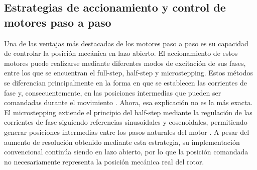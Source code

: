 \subsection{Estrategias de accionamiento y control de motores paso a paso}


%
%
%
%

Una de las ventajas más destacadas de los motores paso a paso es su capacidad de controlar la posición mecánica en lazo abierto. El accionamiento de estos motores puede realizarse mediante diferentes modos de excitación de sus fases, entre los que se encuentran el full-step, half-step y microstepping. Estos métodos se diferencian principalmente en la forma en que se establecen las corrientes de fase y, consecuentemente, en las posiciones intermedias que pueden ser comandadas durante el movimiento \cite{lydellSensorlessHybridFieldOriented}.
%
%
%
%
Ahora, esa explicación no es la más exacta. El microstepping extiende el principio del half-step mediante la regulación de las corrientes de fase siguiendo referencias sinusoidales y cosenoidales, permitiendo generar posiciones intermedias entre los pasos naturales del motor \cite{lydellSensorlessHybridFieldOriented}. A pesar del aumento de resolución obtenido mediante esta estrategia, su implementación convencional continúa siendo en lazo abierto, por lo que la posición comandada no necesariamente representa la posición mecánica real del rotor.


